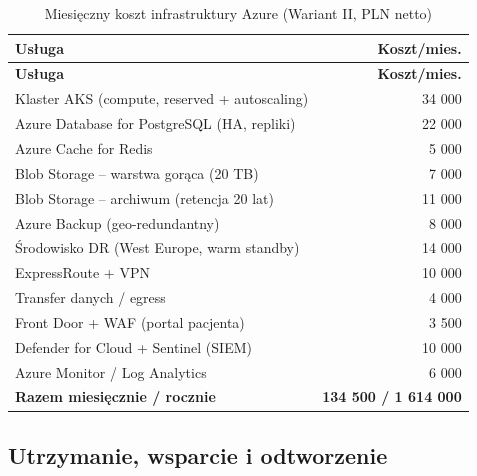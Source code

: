\begin{longtable}{|L{10.5cm}|r|}
\caption{Miesięczny koszt infrastruktury Azure (Wariant II, PLN netto)}
\label{tab:opex_chmura} \\
\hline
{}\textbf{Usługa} & \textbf{Koszt/mies.} \\
\hline
\endfirsthead
\hline
{}\textbf{Usługa} & \textbf{Koszt/mies.} \\
\hline
\endhead
Klaster AKS (compute, reserved + autoscaling) & 34 000 \\
\hline
Azure Database for PostgreSQL (HA, repliki) & 22 000 \\
\hline
Azure Cache for Redis & 5 000 \\
\hline
Blob Storage -- warstwa gorąca (20 TB) & 7 000 \\
\hline
Blob Storage -- archiwum (retencja 20 lat) & 11 000 \\
\hline
Azure Backup (geo-redundantny) & 8 000 \\
\hline
Środowisko DR (West Europe, warm standby) & 14 000 \\
\hline
ExpressRoute + VPN & 10 000 \\
\hline
Transfer danych / egress & 4 000 \\
\hline
Front Door + WAF (portal pacjenta) & 3 500 \\
\hline
Defender for Cloud + Sentinel (SIEM) & 10 000 \\
\hline
Azure Monitor / Log Analytics & 6 000 \\
\hline
{}\textbf{Razem miesięcznie / rocznie} & \textbf{134 500 / 1 614 000} \\
\hline
\end{longtable}

\subsection{Utrzymanie, wsparcie i odtworzenie}

